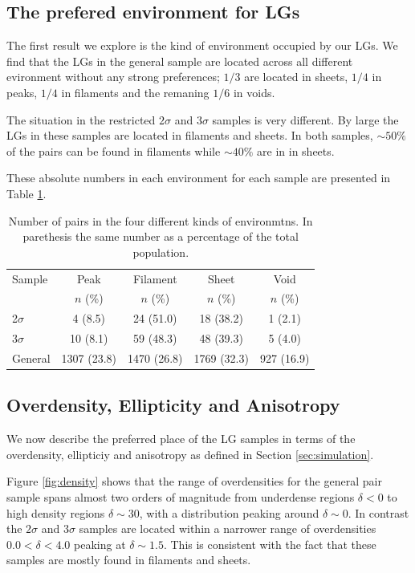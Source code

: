 \documentclass{emulateapj}
\begin{document}
\subsection{The prefered environment for LGs}

The first result we explore is the kind of environment occupied by
our LGs. We find that the LGs in the general sample are located across
all different evironment without any strong preferences; $1/3$  are
located in sheets, $1/4$ in peaks, $1/4$ in filaments and the remaning
$1/6$ in voids. 

The situation in the restricted $2\sigma$ and $3\sigma$ samples is very
different. By large the LGs in these samples are located in
filaments and sheets. In both samples, $\sim 50\%$ of the
pairs can be found in filaments while $\sim 40\%$ are in
in sheets. 

These absolute numbers in each environment for each sample are
presented in Table \ref{table:web_type}.

\begin{table}
\begin{center}
\begin{tabular}{lcccc}\hline\hline
Sample & Peak & Filament & Sheet & Void\\
       & $n$ (\%) & $n$ (\%) & $n$ (\%) & $n$ (\%) \\\hline
2$\sigma$ & 4 (8.5) & 24 (51.0) &  18 (38.2) & 1 (2.1)\\
3$\sigma$ & 10 (8.1) & 59 (48.3) & 48 (39.3) & 5 (4.0)\\  
General & 1307 (23.8) & 1470 (26.8) & 1769 (32.3) & 927 (16.9)\\\hline
\end{tabular}
\caption{
Number of pairs in the four different kinds of environmtns. In
parethesis the same number as a percentage of the
total population. 
\label{table:web_type}}
\end{center}
\end{table}


\subsection{Overdensity, Ellipticity and Anisotropy}


We now describe the preferred place of the LG samples in terms of the
overdensity, ellipticiy and anisotropy as defined in Section
\ref{sec:simulation}. 

Figure \ref{fig:density} shows that the range of overdensities for the
general pair sample spans almost two orders of magnitude from
underdense regions $\delta<0$ to high density regions $\delta\sim 30$,
with a distribution peaking around $\delta \sim 0$. In contrast the
$2\sigma$ and $3\sigma$ samples are located within a narrower range of
overdensities $0.0<\delta<4.0$ peaking at $\delta \sim 1.5$. This is
consistent with the fact that these samples are mostly found in
filaments and sheets.   
\end{document}
